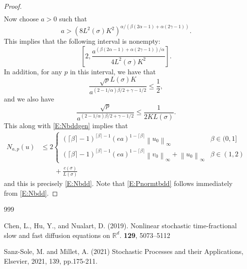 \documentclass[a4paper,11pt]{article}
\numberwithin{equation}{section}
\theoremstyle{plain}
\theoremstyle{definition}
\newcommand{\Norm}[1]{\left\|  #1   \right\|}
\newcommand{\R}{\mathbb{R}}
\numberwithin{NQ}{section}
\numberwithin{LQ}{section}
\numberwithin{ZQ}{section}
\begin{document}
\begin{proof}
\begin{align}
	\end{align}
Now choose $a>0$ such that 
	\[
		a > \left( 8 L^2(\sigma)K^2\right)^{\alpha/(\beta(2\alpha-1)+\alpha(2\gamma -1))}.
	\]
This implies that the following interval is nonempty:
	\[
		\left[ 2, \frac{a^{(\beta(2\alpha-1)+\alpha(2\gamma-1))/\alpha}}{4L^2(\sigma)K^2} \right].
	\]
In addition, for any $p$ in this interval, we have that 
	\[
		\frac{\sqrt{p}L(\sigma)K}{a^{(2-1/\alpha)\beta/2+\gamma-1/2}} \le \frac{1}{2},
	\]
and we also have 
	\[
		\frac{\sqrt{p}}{a^{(2-1/\alpha)\beta/2+\gamma-1/2}}  \le \frac{1}{2KL(\sigma)}.
	\]
This along with \eqref{E:Nbddgen} implies that 
	\begin{align*}
		N_{a,p}(u) & \le 2 \begin{cases} 
		(\lceil \beta \rceil - 1)^{\lceil \beta \rceil -1}(ea)^{1-\lceil \beta \rceil} \Norm{u_0}_\infty  & \beta \in (0,1]
		\\ (\lceil \beta \rceil - 1)^{\lceil \beta \rceil -1}(ea)^{1-\lceil \beta \rceil} \Norm{v_0}_\infty + \Norm{u_0}_\infty & \beta \in (1,2)
		\end{cases} 
			\\& \quad \quad + \frac{c(\sigma)}{L(\sigma)}
	\end{align*}
and this is precisely \eqref{E:Nbdd}. Note that \eqref{E:Pnormtbdd} follows immediately from \eqref{E:Nbdd}.  
	\end{proof}
\begin{thebibliography}{999}

	Chen, L., Hu, Y., and Nualart, D. (2019).
	\newblock Nonlinear stochastic time-fractional slow and fast diffusion equations on $\R^d$.
	 \textbf{129}, 5073--5112

	Sanz-Sole, M. and Millet, A. (2021)
	\newblock Stochastic Processes and their Applications, Elsevier, 2021, 139, pp.175-211.
\end{thebibliography}
\end{document}
